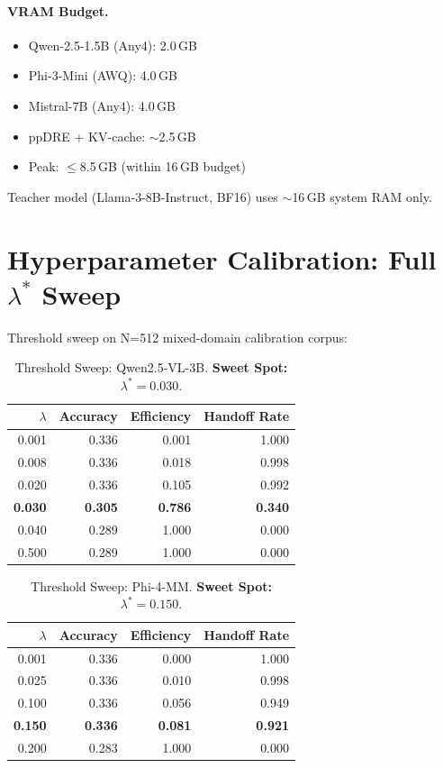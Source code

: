 \documentclass[runningheads]{article} %
\begin{document}
\paragraph{VRAM Budget.}
\begin{itemize}
  \item Qwen-2.5-1.5B (Any4): 2.0\,GB
  \item Phi-3-Mini (AWQ): 4.0\,GB
  \item Mistral-7B (Any4): 4.0\,GB
  \item ppDRE + KV-cache: $\sim$2.5\,GB
  \item Peak: $\leq$8.5\,GB (within 16\,GB budget)
\end{itemize}
Teacher model (Llama-3-8B-Instruct, BF16) uses $\sim$16\,GB system RAM only.

\section{Hyperparameter Calibration: Full \texorpdfstring{$\lambda^*$}{lambda*} Sweep}
\label{app:calibration}

Threshold sweep on N=512 mixed-domain calibration corpus:

\begin{table}[H]
\centering
\caption{Threshold Sweep: Qwen2.5-VL-3B. \textbf{Sweet Spot: $\lambda^* = 0.030$}.}
\begin{tabular}{@{}rrrr@{}}
\toprule
$\lambda$ & Accuracy & Efficiency & Handoff Rate \\
\midrule
0.001 & 0.336 & 0.001 & 1.000 \\
0.008 & 0.336 & 0.018 & 0.998 \\
0.020 & 0.336 & 0.105 & 0.992 \\
\textbf{0.030} & \textbf{0.305} & \textbf{0.786} & \textbf{0.340} \\
0.040 & 0.289 & 1.000 & 0.000 \\
0.500 & 0.289 & 1.000 & 0.000 \\
\bottomrule
\end{tabular}
\end{table}

\begin{table}[H]
\centering
\caption{Threshold Sweep: Phi-4-MM. \textbf{Sweet Spot: $\lambda^* = 0.150$}.}
\begin{tabular}{@{}rrrr@{}}
\toprule
$\lambda$ & Accuracy & Efficiency & Handoff Rate \\
\midrule
0.001 & 0.336 & 0.000 & 1.000 \\
0.025 & 0.336 & 0.010 & 0.998 \\
0.100 & 0.336 & 0.056 & 0.949 \\
\textbf{0.150} & \textbf{0.336} & \textbf{0.081} & \textbf{0.921} \\
0.200 & 0.283 & 1.000 & 0.000 \\
\bottomrule
\end{tabular}
\end{table}
\end{document}
